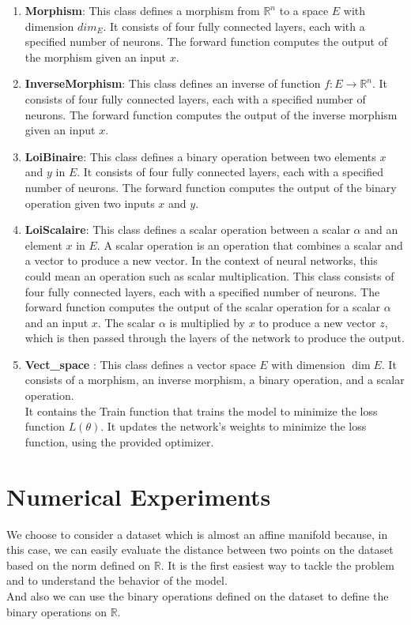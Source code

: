 \documentclass{article}
\begin{document}
    \begin{enumerate}
        \item \textbf{Morphism}: This class defines a morphism from 
        $\mathbb{R}^n$ to a space $E$ with dimension $dim_E$. 
        It consists of four  fully connected layers, each with 
        a specified number of neurons. The forward function computes 
        the output of the morphism given an input $x$.
        \item \textbf{InverseMorphism}: This class defines an inverse
        of function $f: E \rightarrow \mathbb{R}^n$. It consists of
        four fully connected layers, each with a specified number
        of neurons. The forward function computes the output of the
        inverse morphism given an input $x$.
        \item \textbf{LoiBinaire}: This class defines a binary operation 
        between two elements $x$ and $y$ in $E$. It consists of four  
        fully connected layers, each with a specified number of neurons. 
        The forward function computes the output of the binary operation 
        given two inputs $x$ and $y$.
        \item \textbf{LoiScalaire}: 
        This class defines a scalar operation between a scalar $\alpha$ and an element $x$ in $E$. A scalar operation is an operation that combines a scalar and a vector to produce a new vector. In the context of neural networks, this could mean an operation such as scalar multiplication. This class consists of four fully connected layers, each with a specified number of neurons. The forward function computes the output of the scalar operation for a scalar $\alpha$ and an input $x$. The scalar $\alpha$ is multiplied by $x$ to produce a new vector $z$, which is then passed through the layers of the network to produce the output.
        \item \textbf{Vect\_space} : This class defines a vector space $E$ with dimension $\dim{E}$. It consists of a morphism, an inverse morphism, a binary operation, and a scalar operation. 
        \\ 
        It contains the Train function that trains the model to minimize the loss function $L(\theta)$. It updates the network's weights to minimize the loss function, using the provided optimizer. 
    \end{enumerate}


\section{Numerical Experiments}
    We choose to consider a dataset  which is almost an affine manifold because, in this case, we can easily evaluate the distance between two points on the dataset based on the norm defined on $\mathbb{R}$. It is the first easiest way to tackle the problem and to understand the behavior of the model.\\
    And also we can use the binary operations defined on the dataset to define the binary operations on $\mathbb{R}$.
\end{document}
